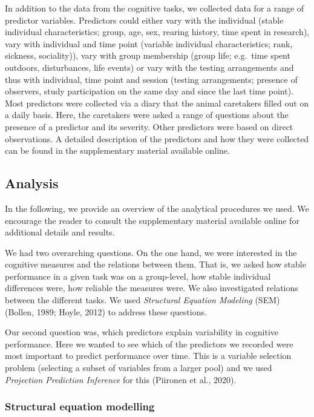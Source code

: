 \documentclass[
  man,floatsintext]{apa6}
\begin{document}
In addition to the data from the cognitive tasks, we collected data for a range of predictor variables. Predictors could either vary with the individual (stable individual characteristics; group, age, sex, rearing history, time spent in research), vary with individual and time point (variable individual characteristics; rank, sickness, sociality)), vary with group membership (group life; e.g.~time spent outdoors, disturbances, life events) or vary with the testing arrangements and thus with individual, time point and session (testing arrangements; presence of observers, study participation on the same day and since the last time point). Most predictors were collected via a diary that the animal caretakers filled out on a daily basis. Here, the caretakers were asked a range of questions about the presence of a predictor and its severity. Other predictors were based on direct observations. A detailed description of the predictors and how they were collected can be found in the supplementary material available online.

\hypertarget{analysis}{%
\subsection{Analysis}\label{analysis}}

In the following, we provide an overview of the analytical procedures we used. We encourage the reader to consult the supplementary material available online for additional details and results.

We had two overarching questions. On the one hand, we were interested in the cognitive measures and the relations between them. That is, we asked how stable performance in a given task was on a group-level, how stable individual differences were, how reliable the measures were. We also investigated relations between the different tasks. We used \emph{Structural Equation Modeling} (SEM) (Bollen, 1989; Hoyle, 2012) to address these questions.

Our second question was, which predictors explain variability in cognitive performance. Here we wanted to see which of the predictors we recorded were most important to predict performance over time. This is a variable selection problem (selecting a subset of variables from a larger pool) and we used \emph{Projection Prediction Inference} for this (Piironen et al., 2020).

\hypertarget{structural-equation-modelling}{%
\subsubsection{Structural equation modelling}\label{structural-equation-modelling}}
\end{document}
